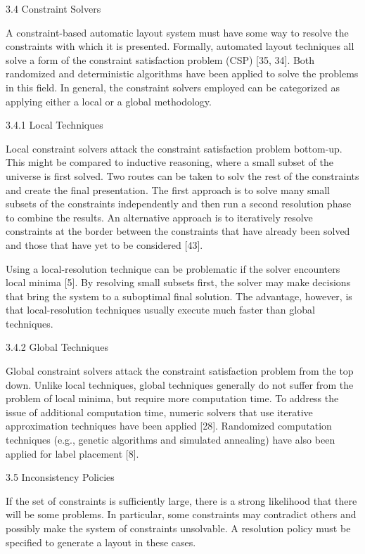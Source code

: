     3.4 Constraint Solvers

    A constraint-based automatic layout system must have some way to resolve the constraints with which it is presented. Formally, automated layout techniques all solve a form of the constraint satisfaction problem (CSP) [35, 34]. Both randomized and deterministic algorithms have been applied to solve the problems in this field. In general, the constraint solvers employed can be categorized as applying either a local or a global methodology.

    3.4.1 Local Techniques

    Local constraint solvers attack the constraint satisfaction problem bottom-up. This might be compared to inductive reasoning, where a small subset of the universe is first solved. Two routes can be taken to solv the rest of the constraints and create the final presentation. The first approach is to solve many small subsets of the constraints independently and then run a second resolution phase to combine the results. An alternative approach is to iteratively resolve constraints at the border between the constraints that have already been solved and those that have yet to be considered [43].

    Using a local-resolution technique can be problematic if the solver encounters local minima [5]. By resolving small subsets first, the solver may make decisions that bring the system to a suboptimal final solution. The advantage, however, is that local-resolution techniques usually execute much faster than global techniques.

    3.4.2 Global Techniques

    Global constraint solvers attack the constraint satisfaction problem from the top down. Unlike local techniques, global techniques generally do not suffer from the problem of local minima, but require more computation time. To address the issue of additional computation time, numeric solvers that use iterative approximation techniques have been applied [28]. Randomized computation techniques (e.g., genetic algorithms and simulated annealing) have also been applied for label placement [8].

    3.5 Inconsistency Policies

    If the set of constraints is sufficiently large, there is a strong likelihood that there will be some problems. In particular, some constraints may contradict others and possibly make the system of constraints unsolvable. A resolution policy must be specified to generate a layout in these cases.

